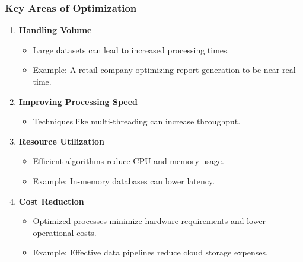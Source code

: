 \documentclass[aspectratio=169]{beamer}
\begin{document}
\begin{frame}[fragile]
    \frametitle{Key Areas of Optimization}
    \begin{enumerate}
        \item \textbf{Handling Volume}
            \begin{itemize}
                \item Large datasets can lead to increased processing times.
                \item Example: A retail company optimizing report generation to be near real-time.
            \end{itemize}
        
        \item \textbf{Improving Processing Speed}
            \begin{itemize}
                \item Techniques like multi-threading can increase throughput.
            \end{itemize}
        
        \item \textbf{Resource Utilization}
            \begin{itemize}
                \item Efficient algorithms reduce CPU and memory usage.
                \item Example: In-memory databases can lower latency.
            \end{itemize}
        
        \item \textbf{Cost Reduction}
            \begin{itemize}
                \item Optimized processes minimize hardware requirements and lower operational costs.
                \item Example: Effective data pipelines reduce cloud storage expenses.
            \end{itemize}
    \end{enumerate}
\end{frame}
\end{document}
